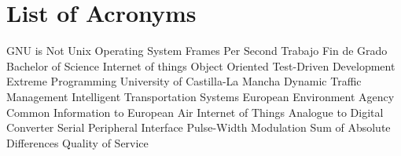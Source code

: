 \chapter{List of Acronyms} %

{\small
\begin{acronym}[XXXXXXXX]
	     	{\acs{GNU} is Not Unix}
			{Operating System}
			{Frames Per Second}
			{Trabajo Fin de Grado}
			{Bachelor of Science}
			{Internet of things}
			{Object Oriented}
			{Test-Driven Development}
			{Extreme Programming}
			{University of Castilla-La Mancha}
			{Dynamic Traffic Management}
			{Intelligent Transportation Systems}
			{European Environment Agency}
		{Common Information to European Air}
	 		{Internet of Things}
			{Analogue to Digital Converter}
			{Serial Peripheral Interface}
			{Pulse-Width Modulation}
			{Sum of Absolute Differences}
			{Quality of Service}
\end{acronym}
}




